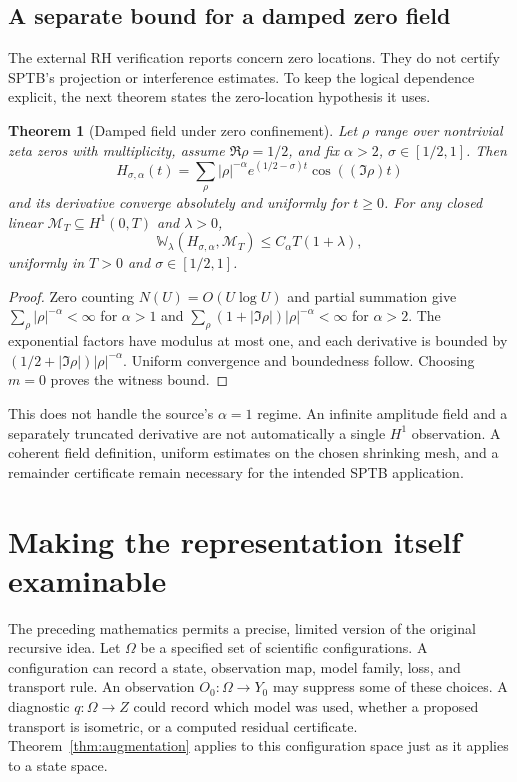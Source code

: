 \documentclass[11pt,letterpaper]{article}
\newtheorem{theorem}{Theorem}[section]
\newcommand{\MM}{\mathcal M}
\newcommand{\WW}{\mathbb W}
\begin{document}
\subsection{A separate bound for a damped zero field}
The external RH verification reports \cite{leancommunity,sutherland}
concern zero locations. They do not certify SPTB's projection or
interference estimates. To keep the logical dependence explicit, the
next theorem states the zero-location hypothesis it uses.

\begin{theorem}[Damped field under zero confinement]\label{thm:field}
Let $\rho$ range over nontrivial zeta zeros with multiplicity, assume
$\Re\rho=1/2$, and fix $\alpha>2$, $\sigma\in[1/2,1]$. Then
\[
H_{\sigma,\alpha}(t)=\sum_\rho|\rho|^{-\alpha}
e^{(1/2-\sigma)t}\cos((\Im\rho)t)
\]
and its derivative converge absolutely and uniformly for $t\ge0$.
For any closed linear $\MM_T\subseteq H^1(0,T)$ and $\lambda>0$,
\[
\WW_\lambda(H_{\sigma,\alpha},\MM_T)
\le C_\alpha T(1+\lambda),
\]
uniformly in $T>0$ and $\sigma\in[1/2,1]$.
\end{theorem}
\begin{proof}
Zero counting $N(U)=O(U\log U)$ \cite{mont} and partial summation give
$\sum_\rho|\rho|^{-\alpha}<\infty$ for $\alpha>1$ and
$\sum_\rho(1+|\Im\rho|)|\rho|^{-\alpha}<\infty$ for $\alpha>2$.
The exponential factors have modulus at most one, and each derivative
is bounded by $(1/2+|\Im\rho|)|\rho|^{-\alpha}$.
Uniform convergence and boundedness follow. Choosing $m=0$ proves
the witness bound.
\end{proof}
This does not handle the source's $\alpha=1$ regime. An infinite
amplitude field and a separately truncated derivative are not
automatically a single $H^1$ observation. A coherent field definition,
uniform estimates on the chosen shrinking mesh, and a remainder
certificate remain necessary for the intended SPTB application.

\section{Making the representation itself examinable}\label{sec:compiler}
The preceding mathematics permits a precise, limited version of the
original recursive idea. Let $\Omega$ be a specified set of scientific
configurations. A configuration can record a state, observation map,
model family, loss, and transport rule. An observation
$O_0:\Omega\to Y_0$ may suppress some of these choices. A diagnostic
$q:\Omega\to Z$ could record which model was used, whether a proposed
transport is isometric, or a computed residual certificate.
Theorem~\ref{thm:augmentation} applies to this configuration space just
as it applies to a state space.
\end{document}
